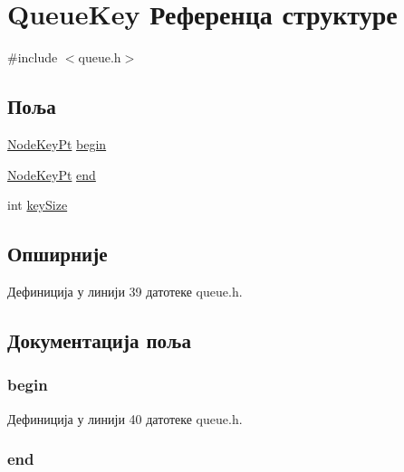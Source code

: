 \hypertarget{struct_queue_key}{\section{Queue\+Key Референца структуре}
\label{struct_queue_key}
}


{\ttfamily \#include $<$queue.\+h$>$}

\subsection*{Поља}
\begin{DoxyCompactItemize}
\item 
\hyperlink{queue_8h_a3bac5142f1f85d4e0969776aea360873}{Node\+Key\+Pt} \hyperlink{struct_queue_key_a7ec7a9ea065c999f76fac2e06dbfca7d}{begin}
\item 
\hyperlink{queue_8h_a3bac5142f1f85d4e0969776aea360873}{Node\+Key\+Pt} \hyperlink{struct_queue_key_afc101427178b779ea4159c4e0f6829b6}{end}
\item 
int \hyperlink{struct_queue_key_a8f871ab46f8b469403161ddc86439093}{key\+Size}
\end{DoxyCompactItemize}


\subsection{Опширније}


Дефиниција у линији 39 датотеке queue.\+h.



\subsection{Документација поља}
\hypertarget{struct_queue_key_a7ec7a9ea065c999f76fac2e06dbfca7d}{
\subsubsection[{begin}]{ begin}}\label{struct_queue_key_a7ec7a9ea065c999f76fac2e06dbfca7d}


Дефиниција у линији 40 датотеке queue.\+h.

\hypertarget{struct_queue_key_afc101427178b779ea4159c4e0f6829b6}{
\subsubsection[{end}]{ end}}\label{struct_queue_key_afc101427178b779ea4159c4e0f6829b6}


